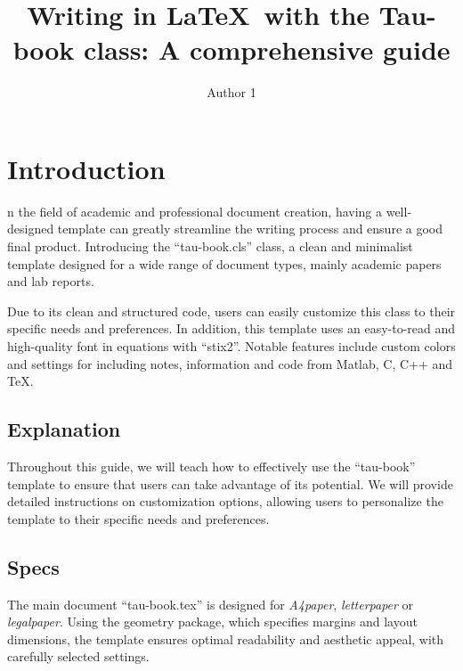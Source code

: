 \documentclass[10pt,a4paper,twoside]{tau-book}
\title{Writing in \LaTeX\ with the Tau-book class: A comprehensive guide}
\author[1]{Author 1}
\affil[1]{Universitat Politècnica de Catalunya - BarcelonaTech}
\begin{document}
	
    \maketitle
    \abscontent
    \thispagestyle{firststyle}



\section{Introduction}

    n the field of academic and professional document creation, having a well-designed template can greatly streamline the writing process and ensure a good final product. Introducing the ``tau-book.cls'' class, a clean and minimalist template designed for a wide range of document types, mainly academic papers and lab reports. 

    Due to its clean and structured code, users can easily customize this class to their specific needs and preferences. In addition, this template uses an easy-to-read and high-quality font in equations with ``stix2''. Notable features include custom colors and settings for including notes, information and code from Matlab, C, C++ and \TeX.
    
    \subsection{Explanation}	

        Throughout this guide, we will teach how to effectively use the ``tau-book'' template to ensure that users can take advantage of its potential. We will provide detailed instructions on customization options, allowing users to personalize the template to their specific needs and preferences.

    \subsection{Specs}

        The main document ``tau-book.tex'' is designed for \textit{A4paper}, \textit{letterpaper} or \textit{legalpaper}. Using the geometry package, which specifies margins and layout dimensions, the template ensures optimal readability and aesthetic appeal, with carefully selected settings.
\end{document}
